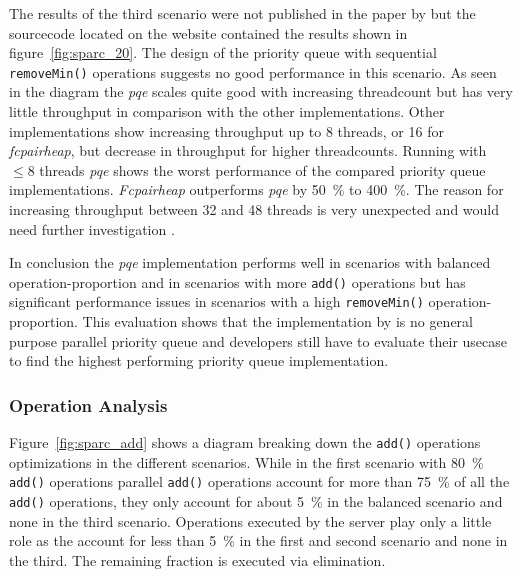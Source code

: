 The results of the third scenario were not published in the paper by \citeauthor{calciu_adaptive_2014} but the sourcecode located on the  website contained the results shown in figure~\ref{fig:sparc_20}. The design of the priority queue with sequential \texttt{removeMin()} operations suggests no good performance in this scenario. As seen in the diagram the \textit{pqe} scales quite good with increasing threadcount but has very little throughput in comparison with the other implementations. Other implementations show increasing throughput up to 8 threads, or 16 for \textit{fcpairheap}, but decrease in throughput for higher threadcounts.  Running with $\le 8$ threads \textit{pqe} shows the worst performance of the compared priority queue implementations. \textit{Fcpairheap} outperforms \textit{pqe} by 50~\% to 400~\%. The reason for increasing throughput between 32 and 48 threads is very unexpected and would need further investigation \cite{calciu_adaptive_2014-1}.

In conclusion the \textit{pqe} implementation performs well in scenarios with balanced operation-proportion and in scenarios with more \texttt{add()} operations but has significant performance issues in scenarios with a high \texttt{removeMin()} operation-proportion. This evaluation shows that the implementation by \citeauthor{calciu_adaptive_2014} is no general purpose parallel priority queue and developers still have to evaluate their usecase to find the highest performing priority queue implementation.

\subsubsection{Operation Analysis}

Figure~\ref{fig:sparc_add} shows a diagram breaking down the \texttt{add()} operations optimizations in the different scenarios. While in the first scenario with 80~\% \texttt{add()} operations parallel \texttt{add()} operations account for more than 75~\% of all the \texttt{add()} operations, they only account for about 5~\% in the balanced scenario and none in the third scenario. Operations executed by the server play only a little role as the account for less than 5~\% in the first and second scenario and none in the third. The remaining fraction is executed via elimination.

